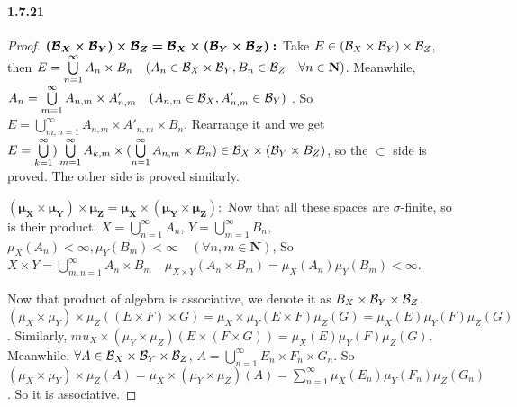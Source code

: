 \documentclass{article}
\begin{document}
\paragraph{1.7.21}
\begin{proof}
$\bm{(\mathcal{B}_X\times\mathcal{B}_Y)\times\mathcal{B}_Z=\mathcal{B}_X\times(\mathcal{B}_Y\times\mathcal{B}_Z):}$ Take $E\in (\mathcal{B}_X\times\mathcal{B}_Y)\times\mathcal{B}_Z$, then $E=\bigcup\limits_{n=1}^\infty A_n\times B_n \quad (A_n\in \mathcal{B}_X\times \mathcal{B}_Y, B_n\in \mathcal{B}_Z\quad \forall n\in\mathbf{N})$. Meanwhile, $A_n=\bigcup\limits_{m=1}^\infty A_{n,m}\times A'_{n,m}\quad (A_{n,m}\in \mathcal{B}_X, A'_{n,m}\in \mathcal{B}_Y)$ . So $E=\bigcup\limits_{m,n=1}^{\infty}A_{n,m}\times A'_{n,m}\times B_n$. Rearrange it and we get $E=\bigcup\limits_{k=1}^\infty)\bigcup\limits_{m=1}^\infty A_{k,m}\times (\bigcup\limits_{n=1}^{\infty}A_{n,m}\times B_n)\in \mathcal{B}_X\times (\mathcal{B}_Y\times B_Z)$, so the $\subset$ side is proved. The other side is proved similarly.

$\bm{(\mu_X\times \mu_Y)\times \mu_Z=\mu_X\times (\mu_Y\times \mu_Z):}$ Now that all these spaces are $\sigma$-finite, so is their product: $X=\bigcup\limits_{n=1}^{\infty}A_n$, $Y=\bigcup\limits_{m=1}^\infty B_n$, $\mu_X(A_n)<\infty, \mu_Y(B_m)<\infty\quad(\forall n,m\in\mathbf{N})$, So $X\times Y=\bigcup\limits_{m,n=1}^\infty A_n\times B_m\quad \mu_{X\times Y}(A_n\times B_m)=\mu_X(A_n)\mu_Y(B_m)<\infty$.

Now that product of algebra is associative, we denote it as $B_X\times \mathcal{B}_Y\times \mathcal{B}_Z$. $(\mu_X\times \mu_Y)\times \mu_Z((E\times F)\times G)=\mu_X\times\mu_Y(E\times F)\mu_Z(G)=\mu_X(E)\mu_Y(F)\mu_Z(G)$. Similarly, $mu_X\times (\mu_Y\times\mu_Z)(E\times (F\times G))=\mu_X(E)\mu_Y(F)\mu_Z(G)$. Meanwhile, $\forall A\in \mathcal{B}_X\times \mathcal{B}_Y\times \mathcal{B}_Z$, $A=\bigcup\limits_{n=1}^\infty E_n\times F_n\times G_n$. So $(\mu_X\times \mu_Y)\times\mu_Z(A)=\mu_X\times(\mu_Y\times \mu_Z)(A)=\sum\limits_{n=1}^\infty \mu_X(E_n)\mu_Y(F_n)\mu_Z(G_n)$. So it is associative.
\end{proof}
\end{document}
